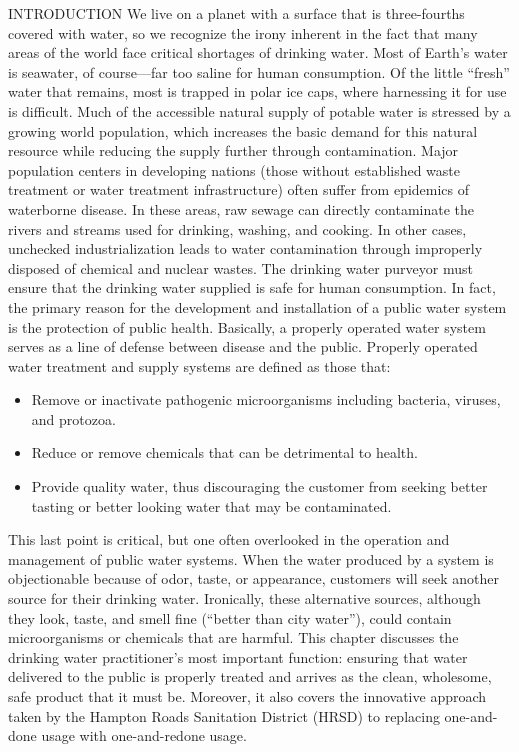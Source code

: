 \documentclass{article}
\begin{document}
INTRODUCTION
We live on a planet with a surface that is three-fourths covered with water, so we recognize the irony inherent in the fact that many areas of the world face critical shortages of drinking water. Most of Earth’s water is seawater, of course—far too saline for human consumption. Of the little “fresh” water that remains, most is trapped in polar ice caps, where harnessing it for use is difficult. Much of the accessible natural supply of potable water is stressed by a growing world population, which increases the basic demand for this natural resource while reducing
the supply further through contamination. Major population centers in developing nations (those without established waste treatment or water treatment infrastructure) often suffer from epidemics of waterborne disease. In these areas, raw sewage can directly contaminate the rivers and streams used for drinking, washing, and cooking. In other cases, unchecked industrialization leads to water contamination through improperly disposed of chemical and nuclear wastes. The drinking water purveyor must ensure that the drinking water supplied is safe for human consumption. In fact, the primary reason for the development and installation of a public water system is the protection of public health. Basically, a properly operated water system serves as a line of defense between disease and the public. Properly operated water treatment and supply systems are defined as those that:\\
\begin{itemize}
\item Remove or inactivate pathogenic microorganisms including bacteria, viruses, and protozoa.
\item Reduce or remove chemicals that can be detrimental to health.
\item Provide quality water, thus discouraging the customer from seeking better tasting or better looking water that may be contaminated.
\end{itemize}
This last point is critical, but one often overlooked in the operation and management of public water systems. When the water produced by a system is objectionable because of odor, taste, or appearance, customers will seek another source for their drinking water. Ironically, these alternative sources, although they look, taste, and smell fine (“better than city water”), could contain microorganisms or chemicals that are harmful. This chapter discusses the drinking water practitioner’s most important function: ensuring that water delivered to the public is properly treated and arrives as the clean, wholesome, safe product that it must be. Moreover, it also covers the innovative approach taken by the Hampton Roads Sanitation District (HRSD) to replacing one-and-done usage with one-and-redone usage.\\
\end{document}
